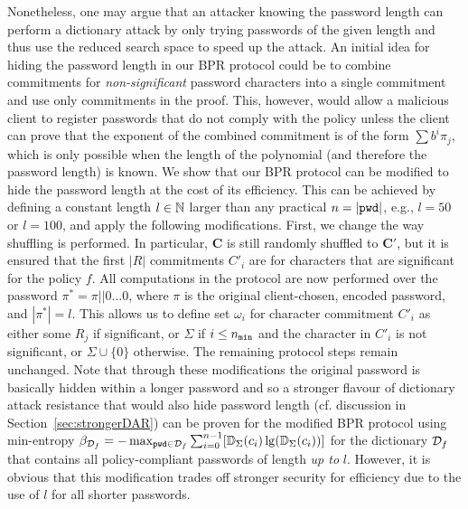 Nonetheless, one may argue that an attacker knowing the password length can perform a dictionary attack by only trying passwords of the given length and thus use the reduced search space to speed up the attack. An initial idea for hiding the password length in our BPR protocol could be to combine commitments for \emph{non-significant} password characters into a single commitment and use only \pmin commitments in the proof. This, however, would allow a malicious client to register passwords that do not comply with the policy unless the client can prove that the exponent of the combined commitment is of the form $\sum b^i\pi_j$, which is only possible when the length of the polynomial (and therefore the password length) is known.
We show that our BPR protocol can be modified to hide the password length at the cost of its efficiency. This can be achieved by defining a constant length $l\in\mathbb{N}$ larger than any practical $n=|\mathtt{pwd}|$, e.g., $l=50$ or $l=100$, and apply the following modifications. First, we change the way shuffling is performed.
In particular, $\bm C$ is still randomly shuffled to $\bm C'$, but it is ensured that the first $|R|$ commitments $C'_i$ are for characters that are significant for the policy $f$.
All computations in the protocol are now performed over the password $\pi^\ast=\pi||0\dots 0$, where $\pi$ is the original client-chosen, encoded password, and $|\pi^\ast|=l$.
This allows us to define set $\omega_i$ for character commitment $C'_i$ as either some $R_j$ if significant, or $\Sigma$ if $i\leq{n_\mathtt{min}}$ and the character in $C'_i$ is not significant, or $\Sigma \cup \{0\}$ otherwise. The remaining protocol steps remain unchanged.
Note that through these modifications the original password is basically hidden within a longer password and so a stronger flavour of dictionary attack resistance that would also hide password length (cf. discussion in Section~\ref{sec:strongerDAR}) can be proven for the modified BPR protocol using min-entropy
$\beta_{\mathcal{D}_{f}} = -\max_{\mathtt{pwd}\in \mathcal{D}_{f}} \sum_{i=0}^{n-1} [\mathbb{D}_\Sigma(c_i)\lg(\mathbb{D}_\Sigma(c_i))]$
for the dictionary $\mathcal{D}_{f}$ that contains all policy-compliant passwords of length \emph{up to} $l$.
However, it is obvious that this modification trades off stronger security for efficiency due to the use of $l$ for all shorter passwords.


